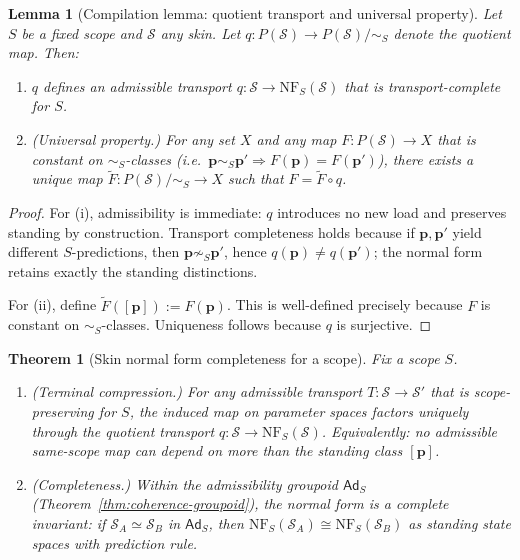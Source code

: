 \documentclass[11pt]{article}
\newtheorem{theorem}[definition]{Theorem}
\newtheorem{lemma}[definition]{Lemma}
\theoremstyle{remark}
\newcommand{\Skin}{\mathcal{S}}
\newcommand{\Ad}{\ensuremath{\mathsf{Ad}}}
\begin{document}
\begin{lemma}[Compilation lemma: quotient transport and universal property]\label{lem:compile}
Let $S$ be a fixed scope and $\Skin$ any skin.
Let $q:P(\Skin)\to P(\Skin)/\!\sim_S$ denote the quotient map.
Then:
\begin{enumerate}[label=(\roman*),leftmargin=2.2em]
\item $q$ defines an admissible transport $q:\Skin\to \mathrm{NF}_S(\Skin)$ that is transport-complete for $S$.
\item (Universal property.) For any set $X$ and any map $F:P(\Skin)\to X$ that is constant on $\sim_S$-classes
(i.e.\ $\mathbf{p}\sim_S\mathbf{p}'\Rightarrow F(\mathbf{p})=F(\mathbf{p}')$), there exists a unique map
$\widetilde F:P(\Skin)/\!\sim_S\to X$ such that $F=\widetilde F\circ q$.
\end{enumerate}
\end{lemma}

\begin{proof}
For (i), admissibility is immediate: $q$ introduces no new load and preserves standing by construction.
Transport completeness holds because if $\mathbf{p},\mathbf{p}'$ yield different $S$-predictions, then
$\mathbf{p}\not\sim_S \mathbf{p}'$, hence $q(\mathbf{p})\neq q(\mathbf{p}')$; the normal form retains exactly the
standing distinctions.

For (ii), define $\widetilde F([\mathbf{p}]):=F(\mathbf{p})$. This is well-defined precisely because $F$ is constant
on $\sim_S$-classes. Uniqueness follows because $q$ is surjective.
\end{proof}

\begin{theorem}[Skin normal form completeness for a scope]\label{thm:skin-nf}
Fix a scope $S$.
\begin{enumerate}[label=(\roman*),leftmargin=2.2em]
\item (Terminal compression.) For any admissible transport $T:\Skin\to\Skin'$ that is scope-preserving for $S$,
the induced map on parameter spaces factors uniquely through the quotient transport $q:\Skin\to\mathrm{NF}_S(\Skin)$.
Equivalently: no admissible same-scope map can depend on more than the standing class $[\mathbf{p}]$.
\item (Completeness.) Within the admissibility groupoid $\Ad_S$ (Theorem~\ref{thm:coherence-groupoid}), the normal
form is a complete invariant: if $\Skin_A\simeq \Skin_B$ in $\Ad_S$, then
$\mathrm{NF}_S(\Skin_A)\cong \mathrm{NF}_S(\Skin_B)$ as standing state spaces with prediction rule.
\end{enumerate}
\end{theorem}
\end{document}
